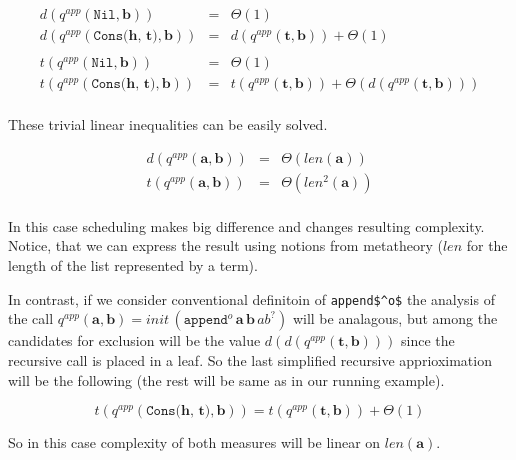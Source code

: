 \[
\begin{array}{lcl}
d(q^{app}(\texttt{Nil}, \mathbf{b})) & = & \Theta(1) \\
d(q^{app}(\texttt{Cons($\mathbf{h}$, $\mathbf{t}$)}, \mathbf{b})) & = & d(q^{app}(\mathbf{t}, \mathbf{b})) + \Theta(1) \\
\\
t(q^{app}(\texttt{Nil}, \mathbf{b})) & = & \Theta(1) \\
t(q^{app}(\texttt{Cons($\mathbf{h}$, $\mathbf{t}$)}, \mathbf{b})) & = & t(q^{app}(\mathbf{t}, \mathbf{b})) + \Theta(d(q^{app}(\mathbf{t}, \mathbf{b}))) \\
\end{array}
 \]
 
These trivial linear inequalities can be easily solved.

\[
\begin{array}{lcl}
d(q^{app}(\mathbf{a}, \mathbf{b})) & = & \Theta(len(\mathbf{a})) \\
t(q^{app}(\mathbf{a}, \mathbf{b})) & = & \Theta(len^2(\mathbf{a})) \\
\end{array}
 \]
 
In this case scheduling makes big difference and changes resulting complexity. Notice, that we can express the result using notions from metatheory ($len$ for the length of the list represented by a term).

In contrast, if we consider conventional definitoin of \lstinline|append$^o$| the analysis of the call $q^{app}(\mathbf{a}, \mathbf{b}) = init\,(\texttt{append$^o$} \, \mathbf{a} \, \mathbf{b} \, ab^?)$ will be analagous, but among the candidates for exclusion will be the value $d(d(q^{app}(\mathbf{t}, \mathbf{b})))$ since the recursive call is placed in a leaf. So the last simplified recursive apprioximation will be the following (the rest will be same as in our running example).

\[ t(q^{app}(\texttt{Cons($\mathbf{h}$, $\mathbf{t}$)}, \mathbf{b})) = t(q^{app}(\mathbf{t}, \mathbf{b})) + \Theta(1) \]

So in this case complexity of both measures will be linear on $len(\mathbf{a})$.